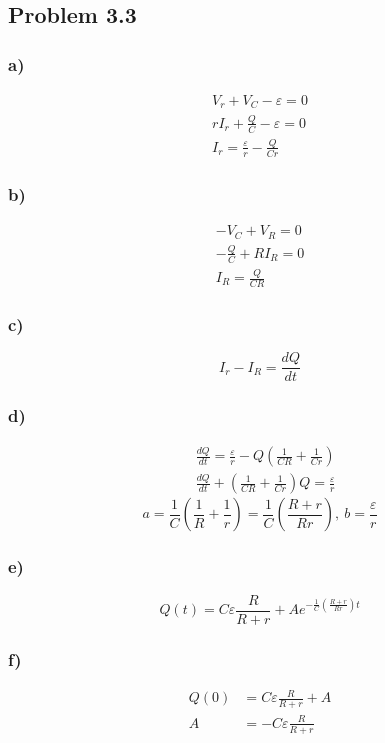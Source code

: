 \documentclass[../homework.tex]{subfiles}
\begin{document}
\subsection{Problem 3.3}
\subsubsection*{a)}
\begin{align*}
    V_r + V_C - \varepsilon = 0 \\
    rI_r + \frac{Q}{C} - \varepsilon = 0 \\
    I_r = \frac{\varepsilon}{r} - \frac{Q}{Cr}
\end{align*}
\subsubsection*{b)}
\begin{align*}
    -V_C + V_R = 0 \\
    -\frac{Q}{C} + RI_R = 0 \\
    I_R = \frac{Q}{CR} 
\end{align*}
\subsubsection*{c)}
\begin{equation*}
    I_r - I_R = \frac{dQ}{dt}
\end{equation*}
\subsubsection*{d)}
\begin{align*}
    &\frac{dQ}{dt} = \frac{\varepsilon}{r} - Q \left(\frac{1}{CR} + \frac{1}{Cr}\right) \\
    &\frac{dQ}{dt} + \left(\frac{1}{CR} + \frac{1}{Cr}\right)Q = \frac{\varepsilon}{r}  
\end{align*}
\begin{equation*}
    a = \frac{1}{C} \left(\frac{1}{R} + \frac{1}{r}\right) = \frac{1}{C} \left(\frac{R+r}{Rr}\right),\ b = \frac{\varepsilon}{r}
\end{equation*}

\subsubsection*{e)}
\begin{equation*}
    Q(t) = C \varepsilon \frac{R}{R + r} + Ae^{-\frac{1}{C} \left(\frac{R + r}{Rr}\right)t} 
\end{equation*}

\subsubsection*{f)}
\begin{align*}
    Q(0) &= C \varepsilon \frac{R}{R + r} + A \\
    A &= -C \varepsilon \frac{R}{R + r}
\end{align*}
\end{document}
